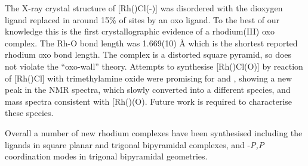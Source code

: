 The X-ray crystal structure of [Rh(\tBuxantphos)Cl(-)] was disordered with the dioxygen ligand replaced in around 15\% of sites by an oxo ligand.  To the best of our knowledge this is the first crystallographic evidence of a rhodium(III) oxo complex.  The Rh-O bond length was 1.669(10) \si{\angstrom} which is the shortest reported rhodium oxo bond length.  The complex is a distorted square pyramid, so does not violate the ``oxo-wall'' theory.  Attempts to synthesise [Rh(\tBuxantphosk)Cl(O)] by reaction of [Rh(\tBuxantphosk)Cl] with trimethylamine oxide were promising for \tButhixantphos{} and \tBuxantphos{}, showing a new peak in the \phosphorus{} NMR spectra, which slowly converted into a different species, and mass spectra consistent with [Rh(\tBuxantphosk)(O)\ce{]+}.  Future work is required to characterise these species.  

Overall a number of new rhodium complexes have been synthesised including the \tBuxantphos{} ligands in \POP{} square planar and trigonal bipyramidal complexes, and \dento{}-\emph{P,P}\textprime{} coordination modes in trigonal bipyramidal geometries.  

















